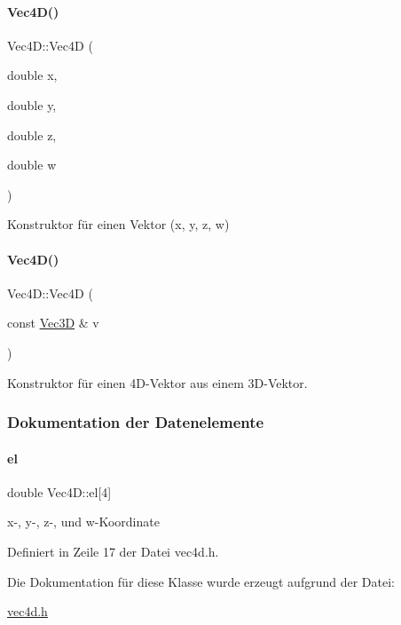 \paragraph{\texorpdfstring{Vec4\+D()}{Vec4D()}\hspace{0.1cm}{\footnotesize\ttfamily [3/4]}}
{\footnotesize\ttfamily Vec4\+D\+::\+Vec4D (\begin{DoxyParamCaption}\item[{double}]{x,  }\item[{double}]{y,  }\item[{double}]{z,  }\item[{double}]{w }\end{DoxyParamCaption})}



Konstruktor für einen Vektor ({\ttfamily x}, {\ttfamily y}, {\ttfamily z}, {\ttfamily w}) 

\mbox{\label{classVec4D_a603ea8a3195095b0c1f4286ae6d93f45}} 
\paragraph{\texorpdfstring{Vec4\+D()}{Vec4D()}\hspace{0.1cm}{\footnotesize\ttfamily [4/4]}}
{\footnotesize\ttfamily Vec4\+D\+::\+Vec4D (\begin{DoxyParamCaption}\item[{const \mbox{\hyperlink{classVec3D}{Vec3D}} \&}]{v }\end{DoxyParamCaption})}



Konstruktor für einen 4\+D-\/\+Vektor aus einem 3\+D-\/\+Vektor. 



\subsubsection{Dokumentation der Datenelemente}
\mbox{\label{classVec4D_a8e0e1401fd89d0868dd3aa7c1000198a}} 
\paragraph{\texorpdfstring{el}{el}}
{\footnotesize\ttfamily double Vec4\+D\+::el\mbox{[}4\mbox{]}}



x-\/, y-\/, z-\/, und w-\/\+Koordinate 



Definiert in Zeile 17 der Datei vec4d.\+h.



Die Dokumentation für diese Klasse wurde erzeugt aufgrund der Datei\+:\begin{DoxyCompactItemize}
\item 
\mbox{\hyperlink{vec4d_8h}{vec4d.\+h}}\end{DoxyCompactItemize}
